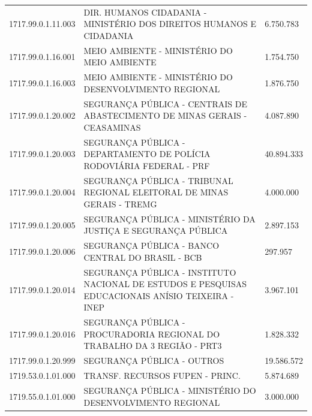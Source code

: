 \documentclass{article}
\begin{document}
\begin{longtable}[c]{m{2cm}|m{13cm}|m{2cm}}
\multicolumn{1}{C{2cm}|}{1717.99.0.1.11.003} & \multicolumn{1}{L{13cm}|}{DIR. HUMANOS CIDADANIA - MINISTÉRIO DOS DIREITOS HUMANOS E CIDADANIA} & \multicolumn{1}{R{2cm}}{6.750.783} \\
\multicolumn{1}{C{2cm}|}{1717.99.0.1.16.001} & \multicolumn{1}{L{13cm}|}{MEIO AMBIENTE - MINISTÉRIO DO MEIO AMBIENTE} & \multicolumn{1}{R{2cm}}{1.754.750} \\
\multicolumn{1}{C{2cm}|}{1717.99.0.1.16.003} & \multicolumn{1}{L{13cm}|}{MEIO AMBIENTE - MINISTÉRIO DO DESENVOLVIMENTO REGIONAL} & \multicolumn{1}{R{2cm}}{1.876.750} \\
\multicolumn{1}{C{2cm}|}{1717.99.0.1.20.002} & \multicolumn{1}{L{13cm}|}{SEGURANÇA PÚBLICA - CENTRAIS DE ABASTECIMENTO DE MINAS GERAIS - CEASAMINAS} & \multicolumn{1}{R{2cm}}{4.087.890} \\
\multicolumn{1}{C{2cm}|}{1717.99.0.1.20.003} & \multicolumn{1}{L{13cm}|}{SEGURANÇA PÚBLICA - DEPARTAMENTO DE POLÍCIA RODOVIÁRIA FEDERAL - PRF} & \multicolumn{1}{R{2cm}}{40.894.333} \\
\multicolumn{1}{C{2cm}|}{1717.99.0.1.20.004} & \multicolumn{1}{L{13cm}|}{SEGURANÇA PÚBLICA - TRIBUNAL REGIONAL ELEITORAL DE MINAS GERAIS - TREMG} & \multicolumn{1}{R{2cm}}{4.000.000} \\
\multicolumn{1}{C{2cm}|}{1717.99.0.1.20.005} & \multicolumn{1}{L{13cm}|}{SEGURANÇA PÚBLICA - MINISTÉRIO DA JUSTIÇA E SEGURANÇA PÚBLICA} & \multicolumn{1}{R{2cm}}{2.897.153} \\
\multicolumn{1}{C{2cm}|}{1717.99.0.1.20.006} & \multicolumn{1}{L{13cm}|}{SEGURANÇA PÚBLICA - BANCO CENTRAL DO BRASIL - BCB} & \multicolumn{1}{R{2cm}}{297.957} \\
\multicolumn{1}{C{2cm}|}{1717.99.0.1.20.014} & \multicolumn{1}{L{13cm}|}{SEGURANÇA PÚBLICA - INSTITUTO NACIONAL DE ESTUDOS E PESQUISAS EDUCACIONAIS ANÍSIO TEIXEIRA - INEP} & \multicolumn{1}{R{2cm}}{3.967.101} \\
\multicolumn{1}{C{2cm}|}{1717.99.0.1.20.016} & \multicolumn{1}{L{13cm}|}{SEGURANÇA PÚBLICA - PROCURADORIA REGIONAL DO TRABALHO DA 3 REGIÃO - PRT3} & \multicolumn{1}{R{2cm}}{1.828.332} \\
\multicolumn{1}{C{2cm}|}{1717.99.0.1.20.999} & \multicolumn{1}{L{13cm}|}{SEGURANÇA PÚBLICA - OUTROS} & \multicolumn{1}{R{2cm}}{19.586.572} \\
\multicolumn{1}{C{2cm}|}{1719.53.0.1.01.000} & \multicolumn{1}{L{13cm}|}{TRANSF. RECURSOS FUPEN - PRINC.} & \multicolumn{1}{R{2cm}}{5.874.689} \\
\multicolumn{1}{C{2cm}|}{1719.55.0.1.01.000} & \multicolumn{1}{L{13cm}|}{SEGURANÇA PÚBLICA - MINISTÉRIO DO DESENVOLVIMENTO REGIONAL} & \multicolumn{1}{R{2cm}}{3.000.000} \\

\end{longtable}
\end{document}

